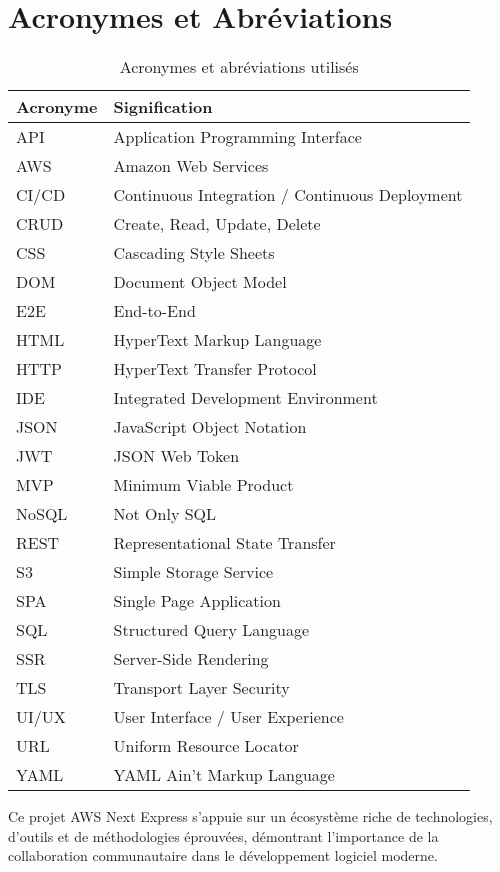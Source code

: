 \section{Acronymes et Abréviations}

\begin{table}[H]
    \centering
    \begin{tabularx}{\textwidth}{|l|X|}
        \hline
        \textbf{Acronyme} & \textbf{Signification} \\
        \hline
        API & Application Programming Interface \\
        \hline
        AWS & Amazon Web Services \\
        \hline
        CI/CD & Continuous Integration / Continuous Deployment \\
        \hline
        CRUD & Create, Read, Update, Delete \\
        \hline
        CSS & Cascading Style Sheets \\
        \hline
        DOM & Document Object Model \\
        \hline
        E2E & End-to-End \\
        \hline
        HTML & HyperText Markup Language \\
        \hline
        HTTP & HyperText Transfer Protocol \\
        \hline
        IDE & Integrated Development Environment \\
        \hline
        JSON & JavaScript Object Notation \\
        \hline
        JWT & JSON Web Token \\
        \hline
        MVP & Minimum Viable Product \\
        \hline
        NoSQL & Not Only SQL \\
        \hline
        REST & Representational State Transfer \\
        \hline
        S3 & Simple Storage Service \\
        \hline
        SPA & Single Page Application \\
        \hline
        SQL & Structured Query Language \\
        \hline
        SSR & Server-Side Rendering \\
        \hline
        TLS & Transport Layer Security \\
        \hline
        UI/UX & User Interface / User Experience \\
        \hline
        URL & Uniform Resource Locator \\
        \hline
        YAML & YAML Ain't Markup Language \\
        \hline
    \end{tabularx}
    \caption{Acronymes et abréviations utilisés}
    \label{tab:acronyms}
\end{table}

Ce projet AWS Next Express s'appuie sur un écosystème riche de technologies, d'outils et de méthodologies éprouvées, démontrant l'importance de la collaboration communautaire dans le développement logiciel moderne. 